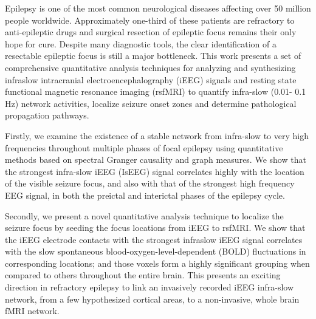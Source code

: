 Epilepsy is one of the most common neurological diseases affecting over 50 million people worldwide. Approximately one-third of these patients are refractory to anti-epileptic drugs and surgical resection of epileptic focus remains their only hope for cure. Despite many diagnostic tools, the clear identification of a resectable epileptic focus is still a major bottleneck. This work presents a set of comprehensive quantitative analysis techniques for analyzing and synthesizing infraslow intracranial electroencephalography (iEEG) signals and resting state functional magnetic resonance imaging (rsfMRI) to quantify infra-slow (0.01- 0.1 Hz) network activities, localize seizure onset zones and determine pathological propagation pathways.

Firstly, we examine the existence of a stable network from infra-slow to very high frequencies throughout multiple phases of focal epilepsy using quantitative methods based on spectral Granger causality and graph measures. We show that the strongest infra-slow iEEG (IsEEG) signal correlates highly with the location of the visible seizure focus, and also with that of the strongest high frequency EEG signal, in both the preictal and interictal phases of the epilepsy cycle. 

Secondly, we present a novel quantitative analysis technique to localize the seizure focus by seeding the focus locations from iEEG to rsfMRI. We show that the iEEG electrode contacts with the strongest infraslow iEEG signal correlates with the slow spontaneous blood-oxygen-level-dependent (BOLD) fluctuations in corresponding locations; and those voxels form a highly significant grouping when compared to others throughout the entire brain. This presents an exciting direction in refractory epilepsy to link an invasively recorded iEEG infra-slow network, from a few hypothesized cortical areas, to a non-invasive, whole brain fMRI network.



